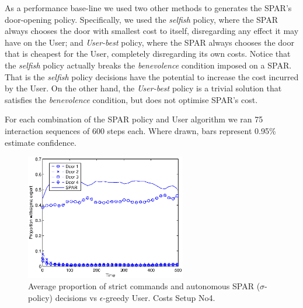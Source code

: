\documentclass{msdm2012}
\begin{document}
As a performance base-line we used two other methods to generates the
SPAR's door-opening policy. Specifically, we used the {\em selfish}
policy, where the SPAR always chooses the door with smallest cost to
itself, disregarding any effect it may have on the User; and {\em
  User-best} policy, where the SPAR always chooses the door that is
cheapest for the User, completely disregarding its own costs. Notice
that the {\em selfish} policy actually breaks the {\em benevolence}
condition imposed on a SPAR. That is the {\em selfish} policy
decisions have the potential to increase the cost incurred by the
User. On the other hand, the {\em User-best} policy is a trivial
solution that satisfies the {\em benevolence} condition, but does not
optimise SPAR's cost.

For each combination of the SPAR policy and User algorithm we ran 75
interaction sequences of 600 steps each. Where drawn, bars represent
0.95\% estimate confidence.

\begin{table}
\caption{\label{costs_distro_table} Costs distributions settings}
\end{table}

\begin{figure}[ht]
\centerline{\includegraphics[width=7cm]{img/prob_egreedy_sigma_v4.eps}}
\caption{\label{vs_egreedy_choice}Average proportion of strict
  commands and autonomous SPAR ($\sigma$-policy) decisions vs
  $\epsilon$-greedy User. Costs Setup No4.}
\end{figure}
\end{document}
